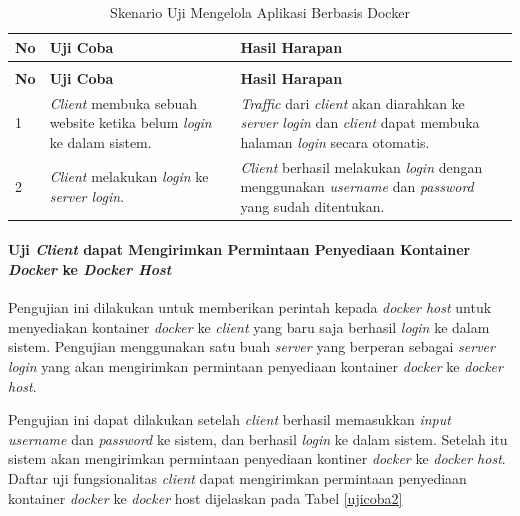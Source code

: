 \begin{longtable}{|p{}|p{}|p{}|}					\caption{Skenario Uji \textit{Client} dapat \textit{Login} ke Dalam Sistem} \label{ujicoba1} \\
	\hline
	\textbf{No} & \textbf{Uji Coba} & \textbf{Hasil Harapan} \\ \hline
	\endfirsthead
	\caption[]{Skenario Uji Mengelola Aplikasi Berbasis Docker} \\
	\hline
	\textbf{No} & \textbf{Uji Coba} & \textbf{Hasil Harapan} \\ \hline
	\endhead
	\endfoot
	\endlastfoot
	
	1 & \textit{Client} membuka sebuah website ketika belum \textit{login} ke dalam sistem. & \textit{Traffic} dari \textit{client} akan diarahkan ke \textit{server login} dan \textit{client} dapat membuka halaman \textit{login} secara otomatis.\\ \hline
	2 & \textit{Client} melakukan \textit{login} ke \textit{server login}. & \textit{Client} berhasil melakukan \textit{login} dengan menggunakan \textit{username} dan \textit{password} yang sudah ditentukan.\\ \hline
\end{longtable}

\paragraph{Uji \textit{Client} dapat Mengirimkan Permintaan Penyediaan Kontainer \textit{Docker} ke \textit{Docker Host}} \label{kedua}
Pengujian ini dilakukan untuk memberikan perintah kepada \textit{docker host} untuk menyediakan kontainer \textit{docker} ke \textit{client} yang baru saja berhasil \textit{login} ke dalam sistem. Pengujian menggunakan satu buah \textit{server} yang berperan sebagai \textit{server login} yang akan mengirimkan permintaan penyediaan kontainer \textit{docker} ke \textit{docker host}.

Pengujian ini dapat dilakukan setelah \textit{client} berhasil memasukkan \textit{input username} dan \textit{password} ke sistem, dan berhasil \textit{login} ke dalam sistem. Setelah itu sistem akan mengirimkan permintaan penyediaan kontiner \textit{docker} ke \textit{docker host}. Daftar uji fungsionalitas \textit{client} dapat mengirimkan permintaan penyediaan kontainer \textit{docker} ke \textit{docker} host dijelaskan pada Tabel \ref{ujicoba2}

